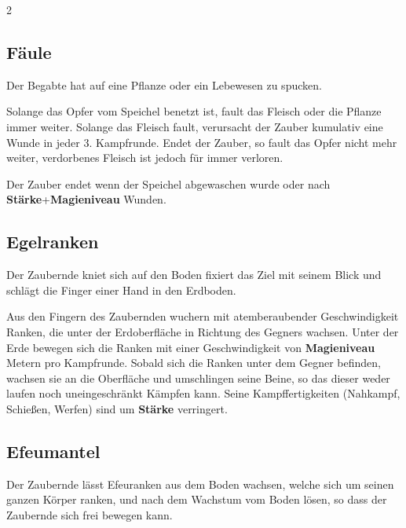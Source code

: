 \begin{multicols*}{2}


\subsection{Fäule}

Der Begabte hat auf eine Pflanze oder ein Lebewesen zu spucken.

Solange das Opfer vom Speichel benetzt ist, fault das Fleisch oder die Pflanze immer weiter. Solange das Fleisch fault, verursacht der Zauber kumulativ eine Wunde in jeder 3. Kampfrunde. Endet der Zauber, so fault das Opfer nicht mehr weiter, verdorbenes Fleisch ist jedoch für immer verloren.

Der Zauber endet wenn der Speichel abgewaschen wurde oder nach \textbf{Stärke}+\textbf{Magieniveau} Wunden.



\subsection{Egelranken}

Der Zaubernde kniet sich auf den Boden fixiert das Ziel mit seinem Blick und schlägt die Finger einer Hand in den Erdboden.

Aus den Fingern des Zaubernden wuchern mit atemberaubender Geschwindigkeit Ranken, die unter der Erdoberfläche in Richtung des Gegners wachsen. Unter der Erde bewegen sich die Ranken mit einer Geschwindigkeit von \textbf{Magieniveau} Metern pro Kampfrunde. Sobald sich die Ranken unter dem Gegner befinden, wachsen sie an die Oberfläche und umschlingen seine Beine, so das dieser weder laufen noch uneingeschränkt Kämpfen kann. Seine Kampffertigkeiten (Nahkampf, Schießen, Werfen) sind um \textbf{Stärke} verringert.



\subsection{Efeumantel}

Der Zaubernde lässt Efeuranken aus dem Boden wachsen, welche sich um seinen ganzen Körper ranken, und nach dem Wachstum vom Boden lösen, so dass der Zaubernde sich frei bewegen kann.


\end{multicols*}
